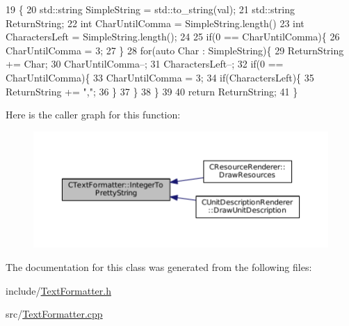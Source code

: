 \begin{DoxyCode}
19                                                       \{
20     std::string SimpleString = std::to\_string(val);
21     std::string ReturnString;
22     \textcolor{keywordtype}{int} CharUntilComma = SimpleString.length() %
23     \textcolor{keywordtype}{int} CharactersLeft = SimpleString.length();
24     
25     \textcolor{keywordflow}{if}(0 == CharUntilComma)\{
26         CharUntilComma = 3;    
27     \}
28     \textcolor{keywordflow}{for}(\textcolor{keyword}{auto} Char : SimpleString)\{
29         ReturnString += Char; 
30         CharUntilComma--;
31         CharactersLeft--;
32         \textcolor{keywordflow}{if}(0 == CharUntilComma)\{
33             CharUntilComma = 3;
34             \textcolor{keywordflow}{if}(CharactersLeft)\{
35                 ReturnString += \textcolor{stringliteral}{","};
36             \}
37         \}
38     \}
39     
40     \textcolor{keywordflow}{return} ReturnString;
41 \}
\end{DoxyCode}
Here is the caller graph for this function\+:\nopagebreak
\begin{figure}[H]
\begin{center}
\leavevmode
\includegraphics[width=350pt]{classCTextFormatter_a99cc7219fb635bff88c31f0b906f5db0_icgraph}
\end{center}
\end{figure}


The documentation for this class was generated from the following files\+:\begin{DoxyCompactItemize}
\item 
include/\hyperlink{TextFormatter_8h}{Text\+Formatter.\+h}\item 
src/\hyperlink{TextFormatter_8cpp}{Text\+Formatter.\+cpp}\end{DoxyCompactItemize}
